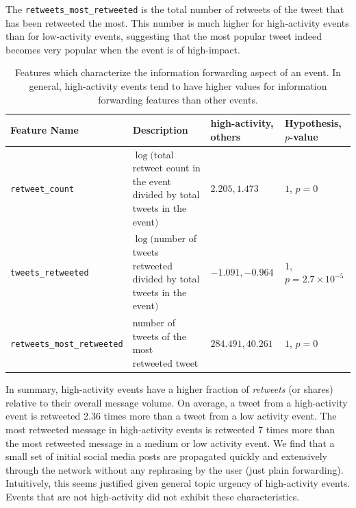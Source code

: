 The \texttt{retweets\_most\_retweeted} is the total number of retweets of the
tweet that has been retweeted the most. 
%
This number is much higher for high-activity events than for low-activity
events, suggesting that the most popular tweet indeed becomes very popular when
the event is of high-impact.

\begin{table}
  \centering
  {\small
    \begin{tabular}{llll}
      \toprule
      Feature Name &  \multicolumn{1}{l}{Description} & high-activity, others& Hypothesis, $p$-value\\
      \midrule
      \texttt{retweet\_count} & \pbox{20cm}{$\log($total retweet count \\in the event divided by total\\ tweets in the event$)$} & $2.205, 1.473$ & $1$, $p = 0$ \\
      \midrule
      \texttt{tweets\_retweeted} & \pbox{20cm}{$\log($number of tweets \\retweeted divided by\\ total tweets in the event$)$} & $-1.091, -0.964$ & $1$, $p = 2.7\times10^{-5}$ \\
      \midrule
      \texttt{retweets\_most\_retweeted} & \pbox{20cm}{number of tweets of the most \\retweeted tweet} & $284.491, 40.261$ & $1$, $p = 0$ \\
      \bottomrule
    \end{tabular}
  }
  \caption[Information forwarding characteristics of events]{Features which characterize the information forwarding aspect of an event.
  In general, high-activity events tend to have higher values for information forwarding 
  features than other events.}
  \label{tab:information_forwarding}
\end{table}


In summary, high-activity events have a higher fraction of {\em retweets} (or
shares) relative to their overall message volume. 
%
On average, a tweet from a high-activity event is retweeted 2.36 times more than
a tweet from a low activity event. 
%
The most retweeted message in high-activity events is retweeted 7 times more
than the most retweeted message in a medium or low activity event. 
%
We find that a small set of initial social media posts are propagated quickly
and extensively through the network without any rephrasing by the user (just
plain forwarding). 
%
Intuitively, this seems justified given general topic urgency of high-activity
events. 
%
Events that are not high-activity did not exhibit these characteristics.

